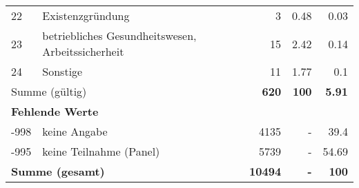\begin{longtable}{lXrrr}
        22 & \multicolumn{1}{X}{Existenzgründung} & %
          \num{3} &
          \num[round-mode=places,round-precision=2]{0,48} &
          \num[round-mode=places,round-precision=2]{0,03} \\

        23 & \multicolumn{1}{X}{betriebliches Gesundheitswesen, Arbeitssicherheit} & %
          \num{15} &
          \num[round-mode=places,round-precision=2]{2,42} &
          \num[round-mode=places,round-precision=2]{0,14} \\

        24 & \multicolumn{1}{X}{Sonstige} & %
          \num{11} &
          \num[round-mode=places,round-precision=2]{1,77} &
          \num[round-mode=places,round-precision=2]{0,1} \\

     \midrule
     \multicolumn{2}{l}{Summe (gültig)} &
       \textbf{\num{620}} &
     \textbf{100} &
       \textbf{\num[round-mode=places,round-precision=2]{5,91}} \\
     \multicolumn{5}{l}{\textbf{Fehlende Werte}}\\
       -998 &
       keine Angabe &
         \num{4135} &
        - &
         \num[round-mode=places,round-precision=2]{39,4} \\
       -995 &
       keine Teilnahme (Panel) &
         \num{5739} &
        - &
         \num[round-mode=places,round-precision=2]{54,69} \\
     \midrule
     \multicolumn{2}{l}{\textbf{Summe (gesamt)}} &
          \textbf{\num{10494}} &
        \textbf{-} &
        \textbf{100} \\
     \bottomrule
     \end{longtable}
     
